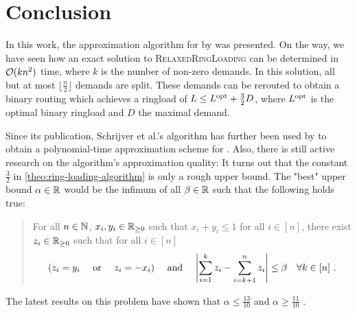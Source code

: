 \section{Conclusion}

In this work, the approximation algorithm for \RL by \citet{schrijver99} was presented.
On the way, we have seen how an exact solution to \textsc{RelaxedRingLoading} can be determined in $\mathcal{O}(k n^2)$ time, where $k$ is the number of non-zero demands.
In this solution, all but at most $\lfloor \frac{n}{2} \rfloor$ demands are split.
These demands can be rerouted to obtain a binary routing which achieves a ringload of $L \leq L^{\mathrm{opt}} + \frac{3}{2}D$, where $L^{\mathrm{opt}}$ is the optimal binary ringload and $D$ the maximal demand.

Since its publication, Schrijver et al.'s  algorithm has further been used by \citet{khanna97} to obtain a polynomial-time approximation scheme for \RL.
Also, there is still active research on the algorithm's approximation quality:
It turns out that the constant $\frac{3}{2}$ in \cref{theo:ring-loading-algorithm} is only a rough upper bound.
The "best" upper bound $\alpha \in \mathbb{R}$ would be the infimum of all $\beta \in \mathbb{R}$ such that the following holds true:
\begin{quote}
	For all $n \in \mathbb{N}$, $x_i, y_i \in \mathbb{R}_{\geq 0}$ such that $x_i + y_i \leq 1$ for all $i \in [n]$, there exist $z_i \in \mathbb{R}_{\geq 0}$ such that for all $i \in [n]$
	\begin{equation}
		(z_i = y_i \quad \text{ or } \quad z_i = -x_i) 
		\quad \text{ and } \quad \abs{\sum_{i=1}^k z_i - \sum_{i = k+1}^n z_i} \leq \beta \quad \forall k \in [n] \ .
	\end{equation}
\end{quote}
The latest results on this problem have shown that $\alpha \leq \frac{13}{10}$ and $\alpha \geq \frac{11}{10}$ \cite{skutella16, daubel19}.